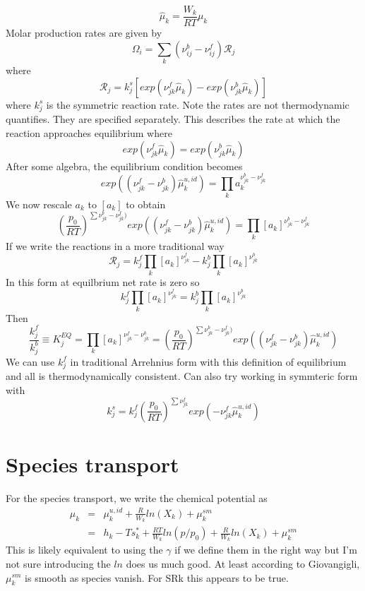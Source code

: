 \documentclass[11pt]{article}
\begin{document}
\[
\hat{\mu}_k = \frac{W_k}{R T}  \mu_k
\]
Molar production rates are given by
\[
\Omega_i = \sum_k (\nu_{ij}^b - \nu_{ij}^f) \mathcal{R}_j
\]
where 
\[
\mathcal{R}_j = k_j^s \left [ exp(\nu_{jk}^f \hat{\mu}_k) - exp ( \nu_{jk}^b \hat{\mu}_k) \right ] 
\]
where $k_j^s$ is the symmetric reaction rate.
Note the rates are not thermodynamic quantifies.  They are specified separately.
This describes the rate at which the reaction approaches equilibrium where
\[
 exp(\nu_{jk}^f \hat{\mu}_k) = exp ( \nu_{jk}^b \hat{\mu}_k) 
\]
After some algebra, the equilibrium condition becomes
\begin{equation}
 exp( (\nu_{jk}^f - \nu_{jk}^b) \hat{\mu}_k^{u,id}) = \prod_k a_k^{\nu_{jk}^b-\nu_{jk}^f}
\end{equation}
We now rescale $a_k$ to $[a_k]$ to obtain
\begin{equation}
\left ( \frac{p_0}{R T}  \right )^{\sum \nu_{jk}^b-\nu_{jk}^f) }exp( (\nu_{jk}^f - \nu_{jk}^b) \hat{\mu}_k^{u,id}) = \prod_k [a_k]^{\nu_{jk}^b-\nu_{jk}^f}
\label{eq:kin_equil_sym}
\end{equation}
If we write the reactions in a more traditional way
\begin{equation}
\mathcal{R}_j = k_j^f \prod_k [a_k]^{\nu_{jk}^f}
- k_j^b \prod_k [a_k]^{\nu_{jk}^b}
\end{equation}
In this form at equilbrium net rate is zero so
\begin{equation}
 k_j^f \prod_k [a_k]^{\nu_{jk}^f}
= k_j^b \prod_k [a_k]^{\nu_{jk}^b}
\end{equation}
Then
\begin{equation}
\frac{k_j^f}{k_j^b} \equiv K_j^{EQ} = 
\prod_k [a_k]^{\nu_{jk}^f - \nu_{jk}^b}
= 
\left ( \frac{p_0}{R T}  \right )^{\sum \nu_{jk}^b-\nu_{jk}^f) } exp( (\nu_{jk}^f - \nu_{jk}^b) \hat{\mu}_k^{u,id})
\label{eq:kin_equil_trad}
\end{equation}
We can use $k_j^f$ in traditional Arrehnius form with this definition of equilibrium and all is thermodynamically
consistent.  Can also try working in symmteric form with
\[
k_j^s =  k_j^f 
\left ( \frac{p_0}{R T}  \right )^{\sum \nu_{jk}^f }exp( -\nu_{jk}^f \hat{\mu}_k^{u,id})
\]

\section{Species transport}

For the species transport, we write the chemical potential as
\begin{eqnarray}
\label{eq:muk_sm}
\mu_k &=& \mu_k^{u,id} + \frac{R}{W_k} ln(X_k)  +  \mu_k^{sm} \\
 &=& h_k - T s_k^* + \frac{R T}{W_k} ln(p/p_0) + \frac{R}{W_k} ln(X_k) + \mu_k^{sm}
\end{eqnarray}
This is likely equivalent to using the $\gamma$ if we define them in the right way but I'm not sure
introducing the $ln$ does us much good.
At least according to Giovangigli, $\mu_k^{sm}$ is smooth as species vanish.  For SRk this appears to be true.
\end{document}
